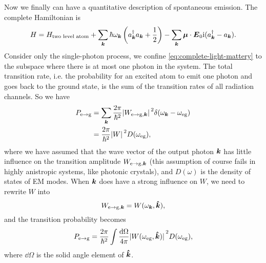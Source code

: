 \documentclass[hyperref, a4paper]{article}
\newcommand*{\ii}{\mathrm{i}}
\begin{document}
Now we finally can have a quantitative description 
of spontaneous emission.
The complete Hamiltonian is 
\begin{equation}
    H = H_{\text{two level atom}} + \sum_{\vb*{k}} \hbar \omega_{\vb*{k}} \left(
        a^\dagger_{\vb*{k}} a_{\vb*{k}} + \frac{1}{2}
    \right) - \sum_{\vb*{k}} \vb*{\mu} \cdot \vb*{E}_0 \ii (a^\dagger_{\vb*{k}} - a_{\vb*{k}}).
\end{equation}
Consider only the single-photon process, 
we confine \eqref{eq:complete-light-mattery} to 
the subspace where there is at most one photon in the system.
The total transition rate, 
i.e. the probability for an excited atom to emit one photon 
and goes back to the ground state, is the sum of  
the transition rates of all radiation channels. 
So we have 
\begin{equation}
    \begin{aligned}
        P_{\text{e} \to \text{g}} 
        &= \sum_{\vb*{k}} \frac{2\pi}{\hbar^2} \abs*{W_{\text{e} \to \text{g}, \vb*{k}}}^2 
        \delta(\omega_{\vb*{k}} - \omega_{\text{eg}})  \\
        &= \frac{2\pi}{\hbar^2} \abs*{W}^2 D(\omega_{\text{eg}}),
    \end{aligned}
\end{equation}
where we have assumed that the wave vector of the output photon $\vb*{k}$ 
has little influence on the transition amplitude $W_{\text{e} \to \text{g}, \vb*{k}}$
(this assumption of course fails in highly anistropic systems, 
like photonic crystals),
and $D(\omega)$ is the density of states of EM modes. 
When $\vb*{k}$ does have a strong influence on $W$, 
we need to rewrite $W$ into 
\begin{equation}
    W_{\text{e} \to \text{g}, \vb*{k}} = W(\omega_{\vb*{k}}, \vu*{k}),
\end{equation}
and the transition probability becomes 
\begin{equation}
    P_{\text{e} \to \text{g}} = 
    \frac{2\pi}{\hbar^2} 
    \int \frac{\dd{\Omega}}{4\pi} \abs*{W(\omega_{\text{eg}}, \vu*{k})}^2 D(\omega_{\text{eg}}),
\end{equation}
where $\dd{\Omega}$ is the solid angle element of $\vu*{k}$.
\end{document}
